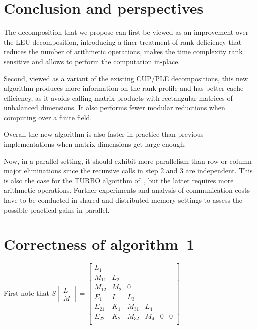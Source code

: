 \documentclass{article}
\begin{document}
 





\section{Conclusion and perspectives}

The decomposition that we propose can first be viewed as an improvement over the
LEU decomposition, introducing a finer treatment of rank deficiency that reduces
the number of arithmetic operations, makes the time complexity rank sensitive
and allows to perform the computation in-place.

Second, viewed as a variant of the existing CUP/PLE decompositions, this new
algorithm produces more information on the rank profile and has better cache
efficiency, as it avoids calling matrix products with rectangular matrices of
unbalanced dimensions. It also  performs fewer modular reductions when computing
over a finite field. 

Overall the new algorithm is also faster in practice than previous
implementations when matrix dimensions get large enough. 

Now, in a parallel setting, it should exhibit more parallelism than row or
column major eliminations since the recursive calls in step 2 and 3 are
independent. This is also the case for the
TURBO algorithm of~\cite{jgd:2002:PComp}, but the latter requires more
arithmetic operations. Further experiments and analysis of communication costs
have to be conducted in shared and distributed memory settings to assess the
possible practical gains in parallel.

{\small


}
\appendix
\renewcommand{\arraystretch}{.7}
\setlength{\arraycolsep}{.2\arraycolsep}

\section{Correctness of algorithm~1}
\label{app:pluq:correct}


First note that 
$S
\begin{bmatrix}
  L\\M
\end{bmatrix}
=\left[
\begin{array}{cccccc}
  L_1  \\
  M_{11} & L_2 \\
  M_{12} & M_2 &0\\
  \hline
E_1   &  I  &L_3\\
  E_{21} &K_1 & M_{31}  & L_4\\
  E_{22} & K_2& M_{32}  & M_4 & 0 &0\\
    \end{array}\right]
$
\end{document}
